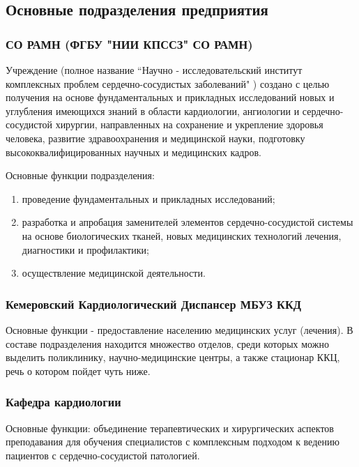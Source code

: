 \subsection{Основные подразделения предприятия}

\subsubsection{СО РАМН (ФГБУ "НИИ КПССЗ" СО РАМН)}
Учреждение (полное название “Научно - исследовательский институт комплексных
проблем сердечно-сосудистых заболеваний" ) создано с целью получения на основе
фундаментальных и прикладных исследований новых и углубления имеющихся знаний в
области  кардиологии, ангиологии и сердечно-сосудистой хирургии, направленных на
сохранение и укрепление здоровья человека, развитие здравоохранения и
медицинской науки, подготовку высококвалифицированных научных и медицинских
кадров.

Основные функции подразделения:
\begin{enumerate}
	\item проведение фундаментальных и прикладных исследований;
	\item разработка и апробация заменителей элементов сердечно-сосудистой системы
на основе биологических тканей, новых медицинских технологий лечения, 
диагностики и профилактики;
	\item осуществление медицинской деятельности.
\end{enumerate}

\subsubsection{Кемеровский Кардиологический Диспансер МБУЗ ККД}
Основные функции - предоставление населению медицинских услуг (лечения). В
составе подразделения находится множество отделов, среди которых можно выделить
поликлинику, научно-медицинские центры, а также стационар ККЦ, речь о котором
пойдет чуть ниже.

\subsubsection{Кафедра кардиологии}
Основные функции:  объединение терапевтических и хирургических аспектов
преподавания для обучения специалистов с комплексным подходом к ведению
пациентов с сердечно-сосудистой патологией.
